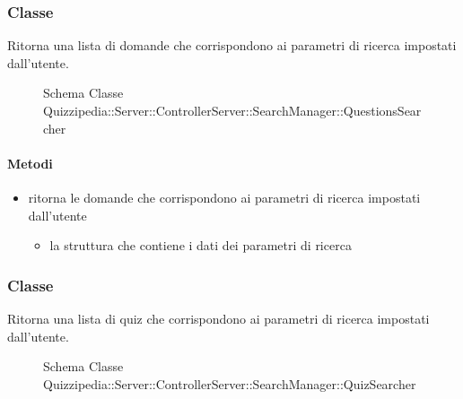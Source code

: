 \subsubsection{Classe }
Ritorna una lista di domande che corrispondono ai parametri di ricerca impostati dall'utente.
\begin{figure}[H]
\centering
\noindent{}
\caption[Schema Classe QuestionsSearcher]{Schema Classe Quizzipedia::Server::ControllerServer::SearchManager::QuestionsSearcher}
\end{figure}
\paragraph{Metodi}
\begin{itemize}
\item {}
\newline
ritorna le domande che corrispondono ai parametri di ricerca impostati dall'utente
\newline
{}
\newline
\begin{itemize}
\item {}
\newline
la struttura che contiene i dati dei parametri di ricerca
\end{itemize}
\end{itemize}
\subsubsection{Classe }
Ritorna una lista di quiz che corrispondono ai parametri di ricerca impostati dall'utente.
\begin{figure}[H]
\centering
\noindent{}
\caption[Schema Classe QuizSearcher]{Schema Classe Quizzipedia::Server::ControllerServer::SearchManager::QuizSearcher}
\end{figure}
